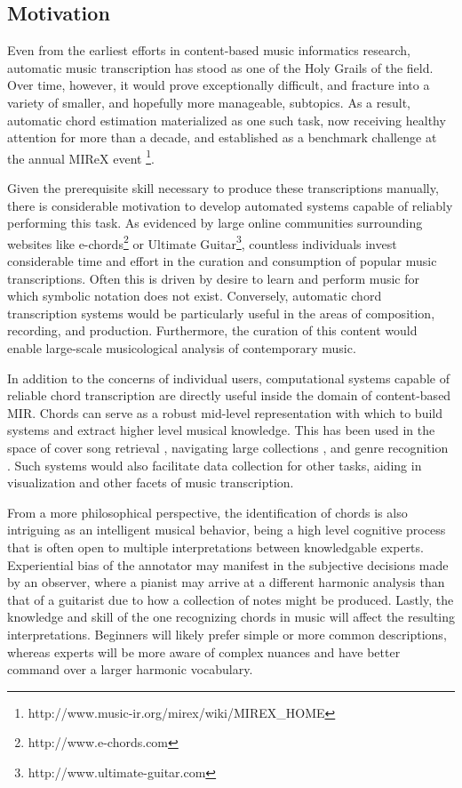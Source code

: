 \subsection{Motivation}
\label{subsec:motivation}

Even from the earliest efforts in content-based music informatics research, automatic music transcription has stood as one of the Holy Grails of the field.
Over time, however, it would prove exceptionally difficult, and fracture into a variety of smaller, and hopefully more manageable, subtopics.
As a result, automatic chord estimation materialized as one such task, now receiving healthy attention for more than a decade, and established as a benchmark challenge at the annual MIReX event \footnote{{http://www.music-ir.org/mirex/wiki/MIREX\_HOME}}.

Given the prerequisite skill necessary to produce these transcriptions manually, there is considerable motivation to develop automated systems capable of reliably performing this task.
As evidenced by large online communities surrounding websites like e-chords\footnote{http://www.e-chords.com} or Ultimate Guitar\footnote{http://www.ultimate-guitar.com}, countless individuals invest considerable time and effort in the curation and consumption of popular music transcriptions.
Often this is driven by desire to learn and perform music for which symbolic notation does not exist.
Conversely, automatic chord transcription systems would be particularly useful in the areas of composition, recording, and production.
Furthermore, the curation of this content would enable large-scale musicological analysis of contemporary music.

In addition to the concerns of individual users, computational systems capable of reliable chord transcription are directly useful inside the domain of content-based MIR.
Chords can serve as a robust mid-level representation with which to build systems and extract higher level musical knowledge.
This has been used in the space of cover song retrieval \cite{Juan?}, navigating large collections \cite{alan?}, and genre recognition \cite{anglade}.
Such systems would also facilitate data collection for other tasks, aiding in visualization and other facets of music transcription.

From a more philosophical perspective, the identification of chords is also intriguing as an intelligent musical behavior, being a high level cognitive process that is often open to multiple interpretations between knowledgable experts.
Experiential bias of the annotator may manifest in the subjective decisions made by an observer, where a pianist may arrive at a different harmonic analysis than that of a guitarist due to how a collection of notes might be produced.
Lastly, the knowledge and skill of the one recognizing chords in music will affect the resulting interpretations.
Beginners will likely prefer simple or more common descriptions, whereas experts will be more aware of complex nuances and have better command over a larger harmonic vocabulary.



